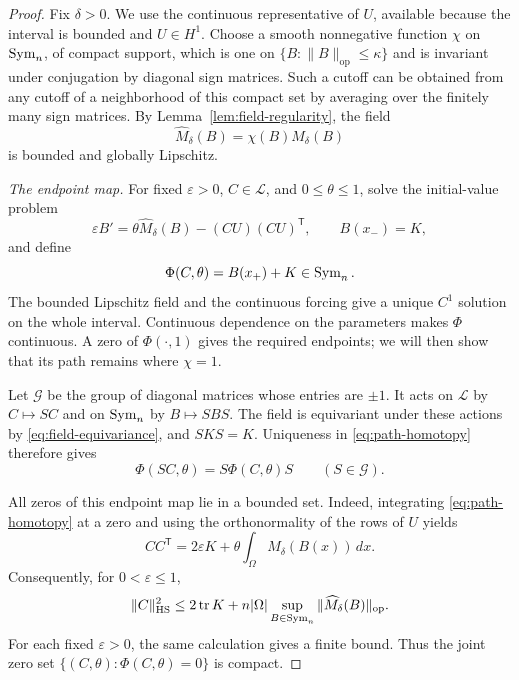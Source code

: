 \begin{proof}
Fix $\delta>0$.  We use the continuous representative of $U$, available
because the interval is bounded and $U\in H^1$.  Choose a smooth
nonnegative function $\chi$ on $\operatorname{Sym}_n$, of compact support, which is
one on $\{B:\|B\|_{\mathrm{op}}\leq\kappa\}$ and is invariant under
conjugation by diagonal sign matrices.  Such a cutoff can be obtained
from any cutoff of a neighborhood of this compact set by averaging over
the finitely many sign matrices.  By Lemma~\ref{lem:field-regularity},
the field
\[
    \widehat M_\delta(B)=\chi(B)M_\delta(B)
\]
is bounded and globally Lipschitz.

\smallskip
\noindent\emph{The endpoint map.}
For fixed $\varepsilon>0$, $C\in\mathcal L$, and $0\leq\theta\leq1$,
solve the initial-value problem
\begin{equation}
\label{eq:path-homotopy}
    \varepsilon B'
       =\theta\widehat M_\delta(B)-(CU)(CU)^{\mathsf T},
    \qquad B(x_-)=K,
\end{equation}
and define
\[
    \Phi(C,\theta)=B(x_+)+K\in\operatorname{Sym}_n.
\]
The bounded Lipschitz field and the continuous forcing give a unique
$C^1$ solution on the whole interval.  Continuous dependence on the
parameters makes $\Phi$ continuous.  A zero of $\Phi(\cdot,1)$ gives
the required endpoints; we will then show that its path remains where
$\chi=1$.

Let $\mathcal G$ be the group of diagonal matrices whose entries are
$\pm1$.  It acts on $\mathcal L$ by $C\mapsto SC$ and on $\operatorname{Sym}_n$
by $B\mapsto SBS$.  The field is equivariant under these actions by
\eqref{eq:field-equivariance}, and $SKS=K$.  Uniqueness in
\eqref{eq:path-homotopy} therefore gives
\begin{equation}
\label{eq:path-equivariance}
    \Phi(SC,\theta)=S\Phi(C,\theta)S
    \qquad(S\in\mathcal G).
\end{equation}

All zeros of this endpoint map lie in a bounded set.  Indeed,
integrating \eqref{eq:path-homotopy} at a zero and using the
orthonormality of the rows of $U$ yields
\begin{equation}
\label{eq:path-integrated}
    CC^{\mathsf T}
       =2\varepsilon K
          +\theta\int_\Omega\widehat M_\delta(B(x))\,dx.
\end{equation}
Consequently, for $0<\varepsilon\leq1$,
\begin{equation}
\label{eq:path-C-bound}
    \|C\|_{\mathrm{HS}}^2
       \leq 2\operatorname{tr} K
          +n|\Omega|\sup_{B\in\operatorname{Sym}_n}
                    \|\widehat M_\delta(B)\|_{\mathrm{op}}.
\end{equation}
For each fixed $\varepsilon>0$, the same calculation gives a finite
bound.  Thus the joint zero set
$\{(C,\theta):\Phi(C,\theta)=0\}$ is compact.


\end{proof}
